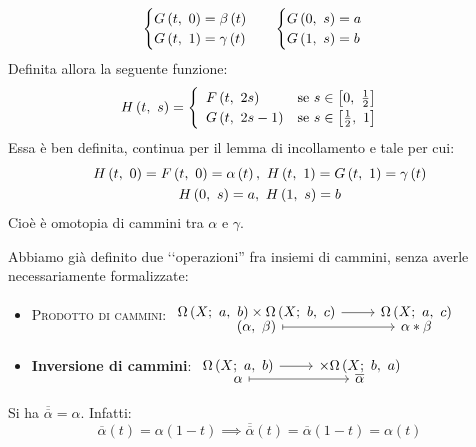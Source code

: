 \begin{demonstration}
\begin{itemize}
\begin{equation*}
\begin{array}{ll}
		\begin{cases}
			G\left(t,\ 0\right)=\beta\left(t\right)\\
			G\left(t,\ 1\right)=\gamma\left(t\right)
		\end{cases}&
	\begin{cases}
			G\left(0,\ s\right)=a\\
			G\left(1,\ s\right)=b
	\end{cases}
	\end{array}
\end{equation*}
Definita allora la seguente funzione:
\begin{equation*}
	\mvf{H}{t}{s}=\begin{cases}
		\begin{array}{ll}
			\mvf{F}{t}{2s}&\text{se }s\in\left[0,\ \frac{1}{2}\right]\\
			\mvf{G}{t}{2s-1}&\text{se }s\in\left[\frac{1}{2},\ 1\right]
		\end{array}
	\end{cases}
\end{equation*}
Essa è ben definita, continua per il lemma di incollamento e tale per cui:
\begin{gather*}
	\mvf{H}{t}{0}=\mvf{F}{t}{0}=\alpha\left(t\right),\ \mvf{H}{t}{1}=\mvf{G}{t}{1}=\gamma\left(t\right)\\
	\mvf{H}{0}{s}=a,\ \mvf{H}{1}{s}=b
\end{gather*}
		Cioè è omotopia di cammini tra $\alpha$ e $\gamma$.
	\end{itemize}
\end{demonstration}
\begin{remember}
Abbiamo già definito due ‘‘operazioni'' fra insiemi di cammini, senza averle necessariamente formalizzate:
\begin{itemize}
\item \textsc{Prodotto di cammini}: $\funztot{\ }{\inscam{X}{a}{b}\times\inscam{X}{b}{c}}{\inscam{X}{a}{c}}{\left(\alpha,\ \beta\right)}{\alpha\ast\beta}$
\item \textbf{Inversione di cammini}: $\funztot{\ }{\inscam{X}{a}{b}}{\times\inscam{X}{b}{a}}{\alpha}{\overline{\alpha}}$
\end{itemize}
\end{remember}
\begin{observe}
Si ha $\overline{\overline{\alpha}}=\alpha$. Infatti:
\begin{equation*}
	\overline{\alpha}\left(t\right)=\alpha\left(1-t\right)\implies\overline{\overline{\alpha}}\left(t\right)=\overline{\alpha}\left(1-t\right)=\alpha\left(t\right)
\end{equation*}
\vspace{-6mm}
\end{observe}
